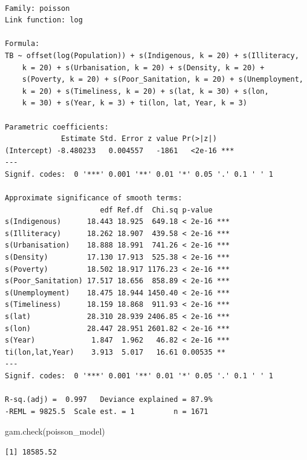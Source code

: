 \documentclass[
  letterpaper,
  DIV=11,
  numbers=noendperiod]{scrartcl}
\newenvironment{Shaded}{\begin{snugshade}}{\end{snugshade}}
\newcommand{\CommentTok}[1]{\textcolor[rgb]{0.37,0.37,0.37}{#1}}
\newcommand{\FunctionTok}[1]{\textcolor[rgb]{0.28,0.35,0.67}{#1}}
\newcommand{\NormalTok}[1]{\textcolor[rgb]{0.00,0.23,0.31}{#1}}
\newcommand{\SpecialCharTok}[1]{\textcolor[rgb]{0.37,0.37,0.37}{#1}}
\begin{document}
\begin{verbatim}

Family: poisson 
Link function: log 

Formula:
TB ~ offset(log(Population)) + s(Indigenous, k = 20) + s(Illiteracy, 
    k = 20) + s(Urbanisation, k = 20) + s(Density, k = 20) + 
    s(Poverty, k = 20) + s(Poor_Sanitation, k = 20) + s(Unemployment, 
    k = 20) + s(Timeliness, k = 20) + s(lat, k = 30) + s(lon, 
    k = 30) + s(Year, k = 3) + ti(lon, lat, Year, k = 3)

Parametric coefficients:
             Estimate Std. Error z value Pr(>|z|)    
(Intercept) -8.480233   0.004557   -1861   <2e-16 ***
---
Signif. codes:  0 '***' 0.001 '**' 0.01 '*' 0.05 '.' 0.1 ' ' 1

Approximate significance of smooth terms:
                      edf Ref.df  Chi.sq p-value    
s(Indigenous)      18.443 18.925  649.18 < 2e-16 ***
s(Illiteracy)      18.262 18.907  439.58 < 2e-16 ***
s(Urbanisation)    18.888 18.991  741.26 < 2e-16 ***
s(Density)         17.130 17.913  525.38 < 2e-16 ***
s(Poverty)         18.502 18.917 1176.23 < 2e-16 ***
s(Poor_Sanitation) 17.517 18.656  858.89 < 2e-16 ***
s(Unemployment)    18.475 18.944 1450.40 < 2e-16 ***
s(Timeliness)      18.159 18.868  911.93 < 2e-16 ***
s(lat)             28.310 28.939 2406.85 < 2e-16 ***
s(lon)             28.447 28.951 2601.82 < 2e-16 ***
s(Year)             1.847  1.962   46.82 < 2e-16 ***
ti(lon,lat,Year)    3.913  5.017   16.61 0.00535 ** 
---
Signif. codes:  0 '***' 0.001 '**' 0.01 '*' 0.05 '.' 0.1 ' ' 1

R-sq.(adj) =  0.997   Deviance explained = 87.9%
-REML = 9825.5  Scale est. = 1         n = 1671
\end{verbatim}

\begin{Shaded}
\begin{Highlighting}[]
\FunctionTok{gam.check}\NormalTok{(poisson\_model)}
\end{Highlighting}
\end{Shaded}

\begin{Shaded}
\end{Shaded}

\begin{verbatim}
[1] 18585.52
\end{verbatim}
\end{document}
